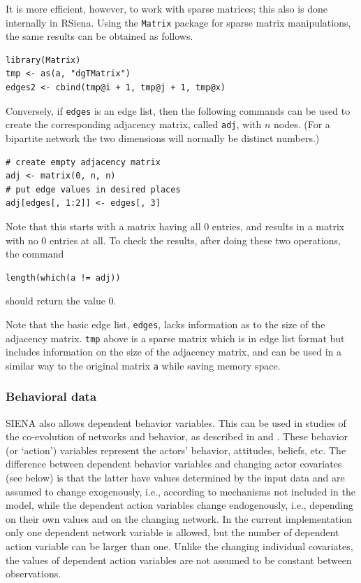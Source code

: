 \documentclass[a4paper,fleqn,11pt]{article}
\newcommand{\+}{\, + \,}
\newcommand{\rs}{{\sf RSiena}}
\newcommand{\SI}{{\sf SIENA }}
\begin{document}
It is more efficient, however, to work with sparse matrices;
this also is done internally in \rs.
Using the \texttt{Matrix} package for sparse matrix manipulations,
the same results can be obtained as follows.
\begin{verbatim}
library(Matrix)
tmp <- as(a, "dgTMatrix")
edges2 <- cbind(tmp@i + 1, tmp@j + 1, tmp@x)
\end{verbatim}
Conversely, if \texttt{edges} is an edge list, then the following commands
can be used to create the corresponding
adjacency matrix, called \texttt{adj},
with $n$ nodes. (For a bipartite network the two dimensions
will normally be distinct numbers.)
\begin{verbatim}
# create empty adjacency matrix
adj <- matrix(0, n, n)
# put edge values in desired places
adj[edges[, 1:2]] <- edges[, 3]
\end{verbatim}
Note that this starts with a matrix having all 0 entries,
and results in a matrix with no 0 entries at all.
To check the results, after doing these two operations, the command
\begin{verbatim}
length(which(a != adj))
\end{verbatim}
should return the value 0.

Note that the basic edge list, \verb|edges|, lacks information as to the size of
the adjacency matrix. \verb|tmp| above is a sparse matrix which is in edge list
format but includes information on the size of the adjacency matrix, and can be
used in a similar way to the original matrix \verb|a| while saving memory space.


\subsubsection{Behavioral data}

\SI also allows dependent behavior variables. This can be used in studies
of the co-evolution of networks and behavior, as described
in \citet*{SnijdersEA07} and \citet*{SteglichEA10}.
These behavior (or `action') variables represent
the actors' behavior, attitudes, beliefs, etc.
The difference between dependent behavior variables and changing actor
covariates (see below) is that the latter
have values determined by the input data and are assumed to
change exogenously, i.e., according
to mechanisms not included in the model, while the dependent
action variables change endogenously, i.e.,
depending on their own values and on the changing network.
In the current implementation only one dependent network variable is
allowed, but the number of dependent action variable can be larger than one.
Unlike the changing individual covariates,
the values of dependent action variables are not assumed to be
constant between observations.
\end{document}
